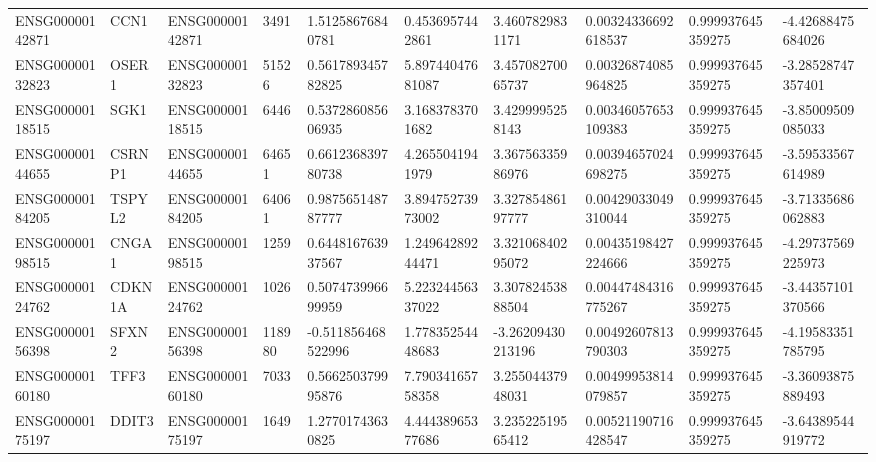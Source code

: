 \begin{tabular}{@{}llllllllll@{}}
ENSG00000142871 & CCN1 & ENSG00000142871 & 3491 & 1.51258676840781 & 0.4536957442861 & 3.4607829831171 & 0.00324336692618537 & 0.999937645359275 & -4.42688475684026 \\
ENSG00000132823 & OSER1 & ENSG00000132823 & 51526 & 0.561789345782825 & 5.89744047681087 & 3.45708270065737 & 0.00326874085964825 & 0.999937645359275 & -3.28528747357401 \\
ENSG00000118515 & SGK1 & ENSG00000118515 & 6446 & 0.537286085606935 & 3.1683783701682 & 3.4299995258143 & 0.00346057653109383 & 0.999937645359275 & -3.85009509085033 \\
ENSG00000144655 & CSRNP1 & ENSG00000144655 & 64651 & 0.661236839780738 & 4.2655041941979 & 3.36756335986976 & 0.00394657024698275 & 0.999937645359275 & -3.59533567614989 \\
ENSG00000184205 & TSPYL2 & ENSG00000184205 & 64061 & 0.987565148787777 & 3.89475273973002 & 3.32785486197777 & 0.00429033049310044 & 0.999937645359275 & -3.71335686062883 \\
ENSG00000198515 & CNGA1 & ENSG00000198515 & 1259 & 0.644816763937567 & 1.24964289244471 & 3.32106840295072 & 0.00435198427224666 & 0.999937645359275 & -4.29737569225973 \\
ENSG00000124762 & CDKN1A & ENSG00000124762 & 1026 & 0.507473996699959 & 5.22324456337022 & 3.30782453888504 & 0.00447484316775267 & 0.999937645359275 & -3.44357101370566 \\
ENSG00000156398 & SFXN2 & ENSG00000156398 & 118980 & -0.511856468522996 & 1.77835254448683 & -3.26209430213196 & 0.00492607813790303 & 0.999937645359275 & -4.19583351785795 \\
ENSG00000160180 & TFF3 & ENSG00000160180 & 7033 & 0.566250379995876 & 7.79034165758358 & 3.25504437948031 & 0.00499953814079857 & 0.999937645359275 & -3.36093875889493 \\
ENSG00000175197 & DDIT3 & ENSG00000175197 & 1649 & 1.27701743630825 & 4.44438965377686 & 3.23522519565412 & 0.00521190716428547 & 0.999937645359275 & -3.64389544919772 \\
\bottomrule
\end{tabular}
\endgroup
